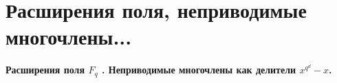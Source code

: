\section{
 Расширения поля, неприводимые многочлены... %
}

\textbf{Расширения поля $F_q$ . Неприводимые многочлены как делители $x^{q^d} - x$.}

